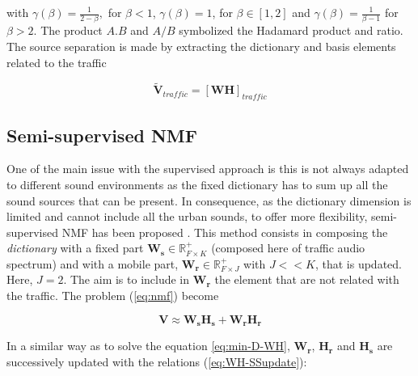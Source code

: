 \documentclass[twocolumn,a4paper,10pt]{article}
\begin{document}
with $\gamma(\beta) = \frac{1}{2-\beta},$ for $\beta < 1$, $ \gamma(\beta) = 1$, for $\beta \in \left[1,2\right]$ and $\gamma(\beta) = \frac{1}{\beta-1}$ for $\beta > 2$. The product $A.B$ and $A/B$ symbolized the Hadamard product and ratio. The source separation is made by extracting the dictionary and basis elements related to the traffic

\begin{equation}\label{eq:separationExtraction}
\mathbf{\tilde{V}}_{traffic} = \left[ \mathbf{WH} \right]_{traffic}
\end{equation}

% 
%
%

\subsection{Semi-supervised NMF}

One of the main issue with the supervised approach is this is not always adapted to different sound environments as the fixed dictionary has to sum up all the sound sources that can be present. In consequence, as the dictionary dimension is limited and cannot include all the urban sounds, to offer more flexibility, semi-supervised NMF has been proposed \cite{lee_semi-supervised_2010}. This method consists in composing the \textit{dictionary} with a fixed part $\mathbf{W_s} \in \mathbb{R}^+_{F\times K}$ (composed here of traffic audio spectrum) and with a mobile part, $\mathbf{W_r} \in \mathbb{R}^+_{F\times J}$ with $J <<K$, that is updated. Here, $J = 2$. The aim is to include in $\mathbf{W_r}$ the element that are not related with the traffic. The problem (\ref{eq:nmf}) become

\begin{equation}
\mathbf{V} \approx \mathbf{W_s H_s}+ \mathbf{W_r H_r}
\end{equation}

In a similar way as to solve the equation \ref{eq:min-D-WH}, $\mathbf{W_r}$, $\mathbf{H_r}$ and $\mathbf{H_s}$ are successively updated with the relations (\ref{eq:WH-SSupdate}): 
\end{document}
